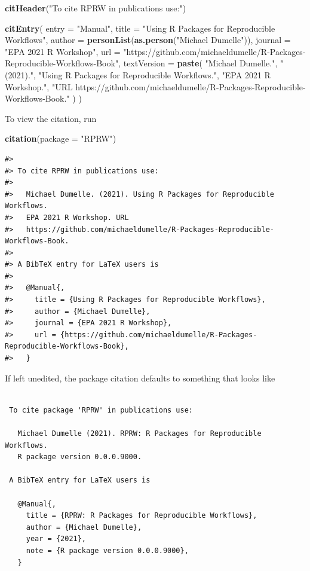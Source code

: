 \documentclass[
]{book}
\newenvironment{Shaded}{\begin{snugshade}}{\end{snugshade}}
\newcommand{\DataTypeTok}[1]{\textcolor[rgb]{0.13,0.29,0.53}{#1}}
\newcommand{\KeywordTok}[1]{\textcolor[rgb]{0.13,0.29,0.53}{\textbf{#1}}}
\newcommand{\NormalTok}[1]{#1}
\newcommand{\StringTok}[1]{\textcolor[rgb]{0.31,0.60,0.02}{#1}}
\begin{document}
\begin{Shaded}
\begin{Highlighting}[]
\KeywordTok{citHeader}\NormalTok{(}\StringTok{"To cite RPRW in publications use:"}\NormalTok{)}

\KeywordTok{citEntry}\NormalTok{(}
  \DataTypeTok{entry    =} \StringTok{"Manual"}\NormalTok{,}
  \DataTypeTok{title    =} \StringTok{"Using R Packages for Reproducible Workflows"}\NormalTok{,}
  \DataTypeTok{author   =} \KeywordTok{personList}\NormalTok{(}\KeywordTok{as.person}\NormalTok{(}\StringTok{"Michael Dumelle"}\NormalTok{)),}
  \DataTypeTok{journal  =} \StringTok{"EPA 2021 R Workshop"}\NormalTok{,}
  \DataTypeTok{url      =} \StringTok{"https://github.com/michaeldumelle/R-Packages-Reproducible-Workflows-Book"}\NormalTok{,}
  \DataTypeTok{textVersion =}
  \KeywordTok{paste}\NormalTok{(}
    \StringTok{"Michael Dumelle."}\NormalTok{,}
    \StringTok{"(2021)."}\NormalTok{,}
    \StringTok{"Using R Packages for Reproducible Workflows."}\NormalTok{,}
    \StringTok{"EPA 2021 R Workshop."}\NormalTok{,}
    \StringTok{"URL https://github.com/michaeldumelle/R-Packages-Reproducible-Workflows-Book."}
\NormalTok{  )}
\NormalTok{)}
\end{Highlighting}
\end{Shaded}

To view the citation, run

\begin{Shaded}
\begin{Highlighting}[]
\KeywordTok{citation}\NormalTok{(}\DataTypeTok{package =} \StringTok{"RPRW"}\NormalTok{)}
\end{Highlighting}
\end{Shaded}

\begin{verbatim}
#> 
#> To cite RPRW in publications use:
#> 
#>   Michael Dumelle. (2021). Using R Packages for Reproducible Workflows.
#>   EPA 2021 R Workshop. URL
#>   https://github.com/michaeldumelle/R-Packages-Reproducible-Workflows-Book.
#> 
#> A BibTeX entry for LaTeX users is
#> 
#>   @Manual{,
#>     title = {Using R Packages for Reproducible Workflows},
#>     author = {Michael Dumelle},
#>     journal = {EPA 2021 R Workshop},
#>     url = {https://github.com/michaeldumelle/R-Packages-Reproducible-Workflows-Book},
#>   }
\end{verbatim}

If left unedited, the package citation defaults to something that looks like

\begin{verbatim}
 
 To cite package 'RPRW' in publications use:
 
   Michael Dumelle (2021). RPRW: R Packages for Reproducible Workflows.
   R package version 0.0.0.9000.
 
 A BibTeX entry for LaTeX users is
 
   @Manual{,
     title = {RPRW: R Packages for Reproducible Workflows},
     author = {Michael Dumelle},
     year = {2021},
     note = {R package version 0.0.0.9000},
   }
\end{verbatim}
\end{document}
